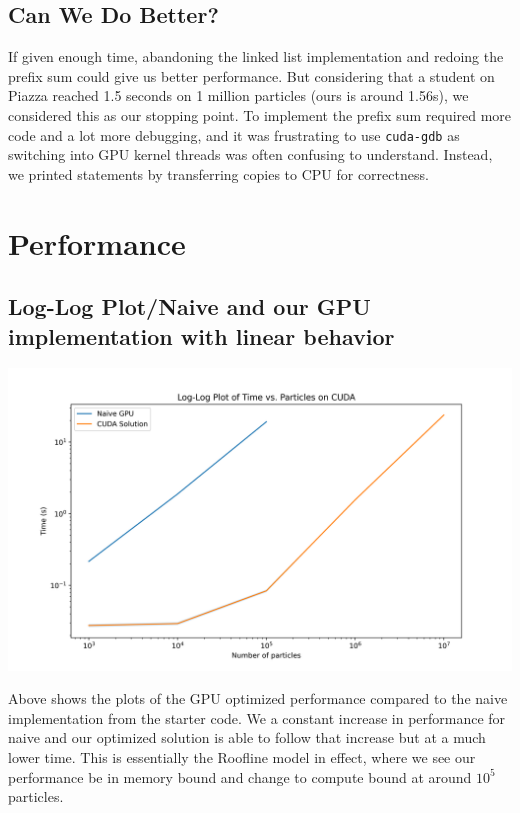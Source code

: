 \documentclass{article}
\begin{document}
\subsection{Can We Do Better?}
If given enough time, abandoning the linked list implementation and redoing the prefix sum could give us better performance. But considering that a student on Piazza reached 1.5 seconds on 1 million particles (ours is around 1.56s), we considered this as our stopping point. To implement the prefix sum required more code and a lot more debugging, and it was frustrating to use \verb|cuda-gdb| as switching into GPU kernel threads was often confusing to understand. Instead, we printed statements by transferring copies to CPU for correctness.

\section{Performance}

\subsection{Log-Log Plot/Naive and our GPU implementation with linear behavior}
\centerline{\includegraphics[width=6in]{figures/log-log.png}}

Above shows the plots of the GPU optimized performance compared to the naive implementation from the starter code. We a constant increase in performance for naive and our optimized solution is able to follow that increase but at a much lower time. This is essentially the Roofline model in effect, where we see our performance be in memory bound and change to compute bound at around $10^5$ particles.
\end{document}
